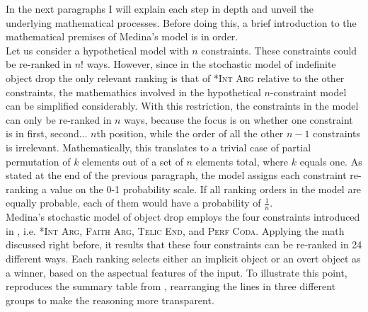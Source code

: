 In the next paragraphs I will explain each step in depth and unveil the underlying mathematical processes. Before doing this, a brief introduction to the mathematical premises of Medina's model is in order.\\
Let us consider a hypothetical model with $n$ constraints. These constraints could be re-ranked in $n!$ ways. However, since in the stochastic model of indefinite object drop the only relevant ranking is that of \textsc{*Int Arg} relative to the other constraints, the mathemathics involved in the hypothetical $n$-constraint model can be simplified considerably. With this restriction, the constraints in the model can only be re-ranked in $n$ ways, because the focus is on whether one constraint is in first, second... $n$th position, while the order of all the other $n-1$ constraints is irrelevant. Mathematically, this translates to a trivial case of partial permutation of $k$ elements out of a set of $n$ elements total, where $k$ equals one. As stated at the end of the previous paragraph, the model assigns each constraint re-ranking a value on the 0-1 probability scale. If all ranking orders in the model are equally probable, each of them would have a probability of $\frac{1}{n}$.\\
Medina's stochastic model of object drop employs the four constraints introduced in , i.e. \textsc{*Int Arg}, \textsc{Faith Arg}, \textsc{Telic End}, and \textsc{Perf Coda}. Applying the math discussed right before, it results that these four constraints can be re-ranked in 24 different ways. Each ranking selects either an implicit object or an overt object as a winner, based on the aspectual features of the input. To illustrate this point,  reproduces the summary table from \textcite[89]{Medina2007}, rearranging the lines in three different groups to make the reasoning more transparent.

